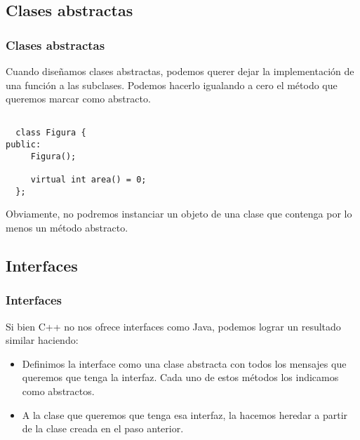 \documentclass{beamer}
\begin{document}
\subsection{Clases abstractas}
\begin{frame}[fragile]
\frametitle{Clases abstractas}

Cuando diseñamos clases abstractas, podemos querer dejar la implementación de una función a las subclases.
Podemos hacerlo igualando a cero el método que queremos marcar como abstracto.

\begin{verbatim}
 
  class Figura {
public:
     Figura();

     virtual int area() = 0;
  };
\end{verbatim}

Obviamente, no podremos instanciar un objeto de una clase que contenga por lo menos un método abstracto.
\end{frame}

\subsection{Interfaces}
\begin{frame}
\frametitle{Interfaces}
Si bien C++ no nos ofrece interfaces como Java, podemos lograr un resultado similar haciendo:
\begin{itemize}
  \item Definimos la interface como una clase abstracta con todos los mensajes que queremos que tenga la interfaz. Cada uno de estos métodos los indicamos como abstractos.
  \item A la clase que queremos que tenga esa interfaz, la hacemos heredar a partir de la clase creada en el paso anterior.
\end{itemize}
\end{frame}
\end{document}
